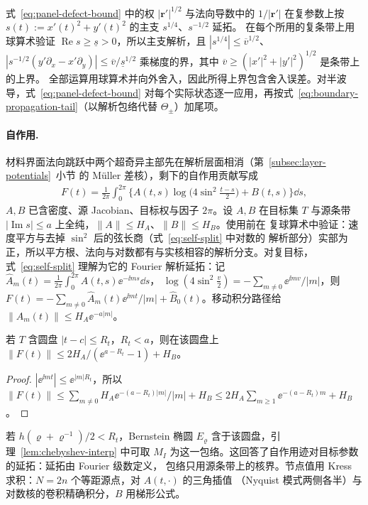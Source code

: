 式~\eqref{eq:panel-defect-bound} 中的权 $|\boldsymbol r'|^{1/2}$ 与法向导数中的
$1/|\boldsymbol r'|$ 在复参数上按 $s(t):=x'(t)^2+y'(t)^2$ 的主支 $s^{1/4}$、$s^{-1/2}$ 延拓。
在每个所用的复条带上用球算术验证 $\operatorname{Re}s\geq\underline s>0$，所以主支解析，且
$|s^{1/4}|\leq\overline v^{1/2}$、$|s^{-1/2}(y'\partial_x-x'\partial_y)|\leq\overline v/\underline s^{1/2}$
乘梯度的界，其中 $\overline v\geq(|x'|^2+|y'|^2)^{1/2}$ 是条带上的上界。
全部运算用球算术并向外舍入，因此所得上界包含舍入误差。对半波导，式~\eqref{eq:panel-defect-bound}
对每个实际状态逐一应用，再按式~\eqref{eq:boundary-propagation-tail}（以解析包络代替
$\Theta_\pm$）加尾项。

\paragraph{自作用.}
材料界面法向跳跃中两个超奇异主部先在解析层面相消（第~\ref{subsec:layer-potentials}~小节
的 Müller 差核），剩下的自作用贡献写成
\begin{align}
  F(t)=\frac1{2\pi}\int_0^{2\pi}\bigl\{A(t,s)\log\bigl(4\sin^2\tfrac{t-s}2\bigr)+B(t,s)\bigr\}\dd s,
  \label{eq:self-split}
\end{align}
$A,B$ 已含密度、源 Jacobian、目标权与因子 $2\pi$。设 $A,B$ 在目标集 $T$ 与源条带
$|\operatorname{Im}s|\leq a$ 上全纯，$\lVert A\rVert\leq H_A$、$\lVert B\rVert\leq H_B$。使用前在
复球算术中验证：速度平方与去掉 $\sin^2$ 后的弦长商（式~\eqref{eq:self-split} 中对数的
解析部分）实部为正，所以平方根、法向与对数都有与实核相容的解析分支。对复目标，
式~\eqref{eq:self-split} 理解为它的 Fourier 解析延拓：记
$\widehat A_m(t)=\frac1{2\pi}\int_0^{2\pi}A(t,s)\ee^{-\ii ms}\dd s$，
$\log(4\sin^2\frac v2)=-\sum_{m\neq0}\ee^{\ii mv}/|m|$，则
$F(t)=-\sum_{m\neq0}\widehat A_m(t)\ee^{\ii mt}/|m|+\widehat B_0(t)$。移动积分路径给
$\lVert\widehat A_m(t)\rVert\leq H_A\ee^{-a|m|}$。

\begin{lemma}[自作用的目标包络]
  \label{lem:self-envelope}
  若 $T$ 含圆盘 $|t-c|\leq R_t$，$R_t<a$，则在该圆盘上
  $\lVert F(t)\rVert\leq 2H_A/(\ee^{a-R_t}-1)+H_B$。
\end{lemma}

\begin{proof}
  $|\ee^{\ii mt}|\leq\ee^{|m|R_t}$，所以
  $\lVert F(t)\rVert\leq\sum_{m\neq0}H_A\ee^{-(a-R_t)|m|}/|m|+H_B
  \leq2H_A\sum_{m\geq1}\ee^{-(a-R_t)m}+H_B$。
\end{proof}

若 $h(\varrho+\varrho^{-1})/2<R_t$，Bernstein 椭圆 $E_\varrho$ 含于该圆盘，引理~\ref{lem:chebyshev-interp}
中可取 $M_I$ 为这一包络。这回答了自作用迹对目标参数的延拓：延拓由 Fourier 级数定义，
包络只用源条带上的核界。节点值用 Kress 求积：$N=2n$ 个等距源点，对 $A(t,\cdot)$ 的三角插值
（Nyquist 模式两侧各半）与对数核的卷积精确积分，$B$ 用梯形公式。


